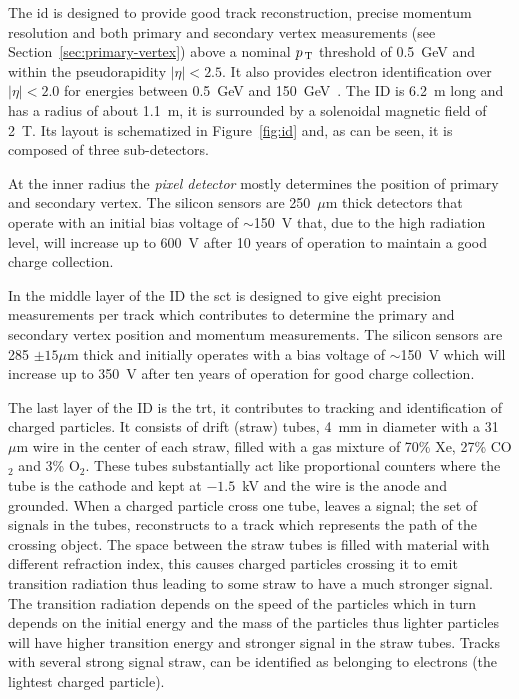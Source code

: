 The \gls{id} is designed to provide good track reconstruction, precise momentum
resolution and both primary and secondary vertex measurements (see
Section~\ref{sec:primary-vertex}) above a nominal $p_\mathrm{\, T}$ threshold of 0.5~GeV and
within the pseudorapidity $|\eta| < 2.5$. It also provides electron
identification over $|\eta| < 2.0$ for energies between 0.5~GeV and
150~GeV~\cite{ATLASPaper}. The ID is 6.2~m long and has a radius of about 1.1~m,
it is surrounded by a solenoidal magnetic field of 2~T. Its layout is
schematized in Figure~\ref{fig:id} and, as can be seen, it is composed of three
sub-detectors.

At the inner radius the \emph{pixel detector} mostly determines the position of
primary and secondary vertex. The silicon sensors are 250~$\mu$m thick detectors
that operate with an initial bias voltage of $\sim$150~V that, due to the high
radiation level, will increase up to 600~V after 10 years of operation to
maintain a good charge collection.

In the middle layer of the ID the \gls{sct} is designed to give eight precision
measurements per track which contributes to determine the primary and secondary
vertex position and momentum measurements. The silicon sensors are 285
$\pm 15 \mu$m thick and initially operates with a bias voltage of $\sim$150~V
which will increase up to 350~V after ten years of operation for good charge
collection.

The last layer of the ID is the \gls{trt}, it contributes to tracking and
identification of charged particles. It consists of drift (straw) tubes, 4~mm in
diameter with a 31~$\mu$m wire in the center of each straw, filled with a gas
mixture of 70\% Xe, 27\% CO$_2$ and 3\% O$_2$. These tubes substantially act
like proportional counters where the tube is the cathode and kept at $- 1.5$~kV
and the wire is the anode and grounded. When a charged particle cross one tube,
leaves a signal; the set of signals in the tubes, reconstructs to a track which
represents the path of the crossing object. The space between the straw tubes is
filled with material with different refraction index, this causes charged
particles crossing it to emit transition radiation thus leading to some straw to
have a much stronger signal. The transition radiation depends on the speed of
the particles which in turn depends on the initial energy and the mass of the
particles thus lighter particles will have higher transition energy and stronger
signal in the straw tubes. Tracks with several strong signal straw, can be
identified as belonging to electrons (the lightest charged particle).


